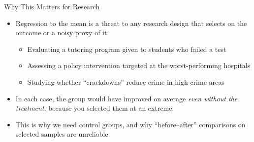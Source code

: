 \documentclass[aspectratio=169, handout]{beamer}
\numberwithin{equation}{section}
\begin{document}
\begin{frame}{Why This Matters for Research}
\begin{itemize}
\item Regression to the mean is a threat to any research design that selects on the outcome or a noisy proxy of it:\pause
\begin{itemize}
\item Evaluating a tutoring program given to students who failed a test
\item Assessing a policy intervention targeted at the worst-performing hospitals
\item Studying whether ``crackdowns'' reduce crime in high-crime areas
\end{itemize}\pause
\item In each case, the group would have improved on average \emph{even without the treatment}, because you selected them at an extreme.\pause
\item This is why we need control groups, and why ``before--after'' comparisons on selected samples are unreliable.
\end{itemize}
\end{frame}
\end{document}

